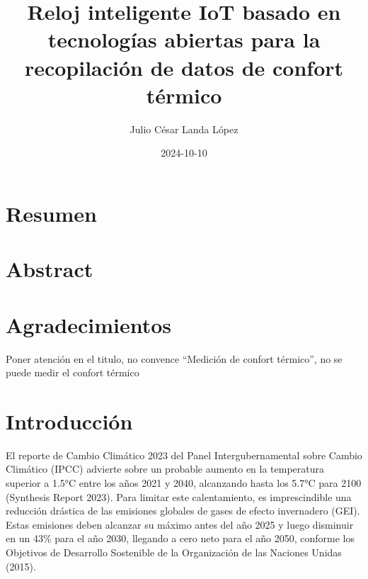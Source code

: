 \documentclass[
  letterpaper,
  DIV=11,
  numbers=noendperiod]{scrreport}
\title{Reloj inteligente IoT basado en tecnologías abiertas para la
recopilación de datos de confort térmico}
\author{Julio César Landa López}
\date{2024-10-10}
\renewcommand*\contentsname{Tabla de contenidos}
\newcommand\contentsname{Tabla de contenidos}
\begin{document}
\maketitle

\renewcommand*\contentsname{Tabla de contenidos}
{
\hypersetup{linkcolor=}
\setcounter{tocdepth}{2}
\tableofcontents
}
\listoffigures
\listoftables


\chapter*{Resumen}\label{resumen}



\chapter*{Abstract}\label{abstract}



\chapter*{Agradecimientos}\label{agradecimientos}


Poner atención en el titulo, no convence ``Medición de confort
térmico'', no se puede medir el confort térmico


\chapter{Introducción}\label{introducciuxf3n}

El reporte de Cambio Climático 2023 del Panel Intergubernamental sobre
Cambio Climático (IPCC) advierte sobre un probable aumento en la
temperatura superior a 1.5°C entre los años 2021 y 2040, alcanzando
hasta los 5.7°C para 2100 (Synthesis Report 2023). Para limitar este
calentamiento, es imprescindible una reducción drástica de las emisiones
globales de gases de efecto invernadero (GEI). Estas emisiones deben
alcanzar su máximo antes del año 2025 y luego disminuir en un 43\% para
el año 2030, llegando a cero neto para el año 2050, conforme los
Objetivos de Desarrollo Sostenible de la Organización de las Naciones
Unidas (2015).
\end{document}
